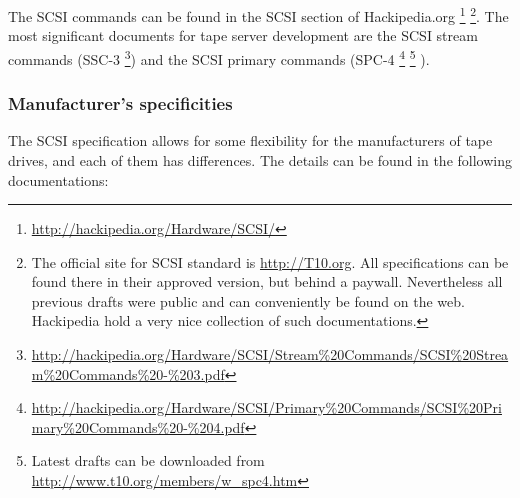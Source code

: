The SCSI commands can be found in the SCSI section of Hackipedia.org
      \footnote{ \href{http://hackipedia.org/Hardware/SCSI/}{http://hackipedia.org/Hardware/SCSI/} }
      \footnote{The official site for SCSI standard is \href{http://T10.org}{http://T10.org}. All specifications
      can be found there in their approved version, but behind a paywall. Nevertheless all previous drafts were
      public and can conveniently be found on the web. Hackipedia hold a very nice collection of such
      documentations.}.
 The most significant documents for tape server development are the SCSI stream commands (SSC-3
      \footnote{ \href{http://hackipedia.org/Hardware/SCSI/Stream\%20Commands/SCSI\%20Stream\%20Commands\%20-\%203.pdf}
                      {http://hackipedia.org/Hardware/SCSI/Stream\%20Commands/SCSI\%20Stream\%20Commands\%20-\%203.pdf} })
 and the SCSI primary commands (SPC-4
      \footnote{ \href{http://hackipedia.org/Hardware/SCSI/Primary\%20Commands/SCSI\%20Primary\%20Commands\%20-\%204.pdf}
                      {http://hackipedia.org/Hardware/SCSI/Primary\%20Commands/SCSI\%20Primary\%20Commands\%20-\%204.pdf} }
      \footnote{ Latest drafts can be downloaded from \href{http://www.t10.org/members/w_spc4.htm}
                                                           {http://www.t10.org/members/w_spc4.htm} } ).

\subsubsection{Manufacturer's specificities}
\label{Manufacturer's specificities}
The SCSI specification allows for some flexibility for the manufacturers of tape drives, and 
each of them has differences. The details can be found in the following documentations:

